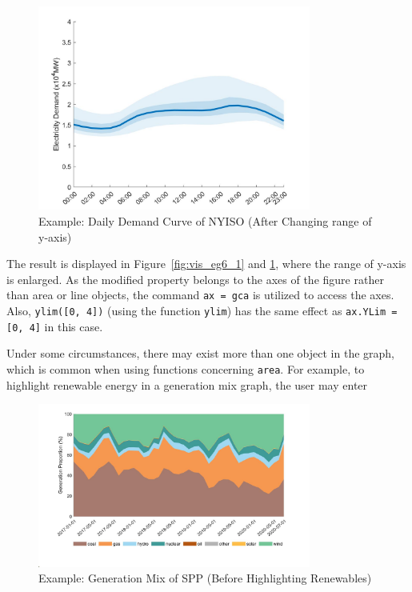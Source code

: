 \documentclass[11pt]{article}
\numberwithin{equation}{section}
\numberwithin{table}{section}
\numberwithin{figure}{section}
\begin{document}
\begin{figure}
  \centering
  \noindent\includegraphics[width=0.8\textwidth]{figures/visualization_example6_2.jpg}
  \caption{Example: Daily Demand Curve of NYISO (After Changing range of y-axis)} \label{fig:vis_eg6_2}
\end{figure}

The result is displayed in Figure~\ref{fig:vis_eg6_1} and \ref{fig:vis_eg6_2}, where the range of y-axis is enlarged. As the modified property belongs to the axes of the figure rather than area or line objects, the command \verb!ax = gca! is utilized to access the axes. Also, \verb!ylim([0, 4])! (using the function \verb!ylim!) has the same effect as \verb!ax.YLim = [0, 4]! in this case.

Under some circumstances, there may exist more than one object in the graph, which is common when using functions concerning \verb!area!. For example, to highlight renewable energy in a generation mix graph, the user may enter


\begin{figure}
  \centering
  \noindent\includegraphics[width=0.8\textwidth]{figures/visualization_example7_1.jpg}
  \caption{Example: Generation Mix of SPP (Before Highlighting Renewables)} \label{fig:vis_eg7_1}
\end{figure}
\end{document}
